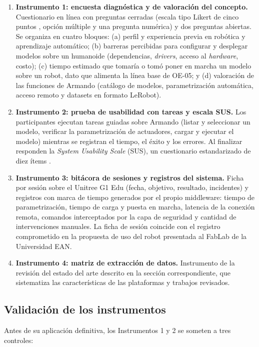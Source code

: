 \documentclass[stu,12pt,floatsintext]{apa7}
\begin{document}
\begin{enumerate}
    \item \textbf{Instrumento 1: encuesta diagnóstica y de valoración del concepto.} Cuestionario en línea con preguntas cerradas (escala tipo Likert de cinco puntos \parencite{likert1932}, opción múltiple y una pregunta numérica) y dos preguntas abiertas. Se organiza en cuatro bloques: (a) perfil y experiencia previa en robótica y aprendizaje automático; (b) barreras percibidas para configurar y desplegar modelos sobre un humanoide (dependencias, \textit{drivers}, acceso al \textit{hardware}, costo); (c) tiempo estimado que tomaría o tomó poner en marcha un modelo sobre un robot, dato que alimenta la línea base de OE-05; y (d) valoración de las funciones de Armando (catálogo de modelos, parametrización automática, acceso remoto y datasets en formato LeRobot).
    \item \textbf{Instrumento 2: prueba de usabilidad con tareas y escala SUS.} Los participantes ejecutan tareas guiadas sobre Armando (listar y seleccionar un modelo, verificar la parametrización de actuadores, cargar y ejecutar el modelo) mientras se registran el tiempo, el éxito y los errores. Al finalizar responden la \textit{System Usability Scale} (SUS), un cuestionario estandarizado de diez ítems \parencite{brooke1996sus}.
    \item \textbf{Instrumento 3: bitácora de sesiones y registros del sistema.} Ficha por sesión sobre el Unitree G1 Edu (fecha, objetivo, resultado, incidentes) y registros con marca de tiempo generados por el propio middleware: tiempo de parametrización, tiempo de carga y puesta en marcha, latencia de la conexión remota, comandos interceptados por la capa de seguridad y cantidad de intervenciones manuales. La ficha de sesión coincide con el registro comprometido en la propuesta de uso del robot presentada al FabLab de la Universidad EAN.
    \item \textbf{Instrumento 4: matriz de extracción de datos.} Instrumento de la revisión del estado del arte descrito en la sección correspondiente, que sistematiza las características de las plataformas y trabajos revisados.
\end{enumerate}

\subsection{Validación de los instrumentos}

Antes de su aplicación definitiva, los Instrumentos 1 y 2 se someten a tres controles:
\end{document}
